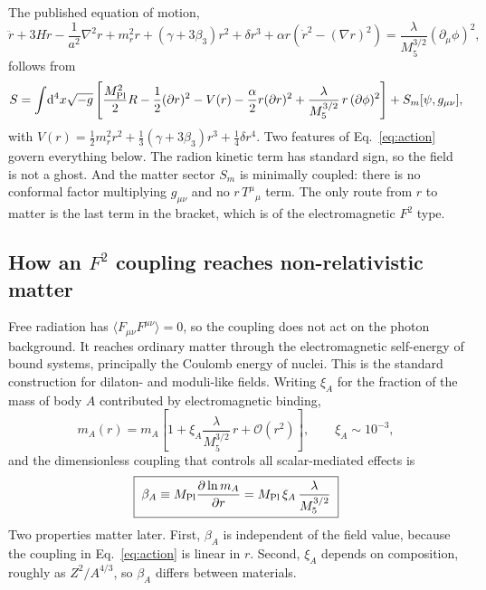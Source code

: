 \documentclass[11pt,a4paper]{article}
\newcommand{\Mpl}{M_{\rm Pl}}
\begin{document}
The published equation of motion,
\begin{equation}
\ddot r+3H\dot r-\frac{1}{a^2}\nabla^2r+m_r^2r+(\gamma+3\beta_3)r^2+\delta r^3
+\alpha r\!\left(\dot r^2-(\nabla r)^2\right)
=\frac{\lambda}{M_5^{3/2}}(\partial_\mu\phi)^2,
\label{eq:eom}
\end{equation}
follows from
\begin{equation}
S=\int\!\mathrm{d}^4x\sqrt{-g}\left[\frac{\Mpl^2}{2}R-\frac12(\partial r)^2-V(r)
-\frac{\alpha}{2}r(\partial r)^2+\frac{\lambda}{M_5^{3/2}}\,r\,(\partial\phi)^2\right]
+S_m[\psi,g_{\mu\nu}],
\label{eq:action}
\end{equation}
with $V(r)=\tfrac12 m_r^2r^2+\tfrac13(\gamma+3\beta_3)r^3+\tfrac14\delta r^4$. Two
features of Eq.~\eqref{eq:action} govern everything below. The radion kinetic term
has standard sign, so the field is not a ghost. And the matter sector $S_m$ is
minimally coupled: there is no conformal factor multiplying $g_{\mu\nu}$ and no
$r\,T^{\mu}{}_{\mu}$ term. The only route from $r$ to matter is the last term in the
bracket, which is of the electromagnetic $F^2$ type.

\subsection{How an \texorpdfstring{$F^2$}{F2} coupling reaches non-relativistic matter}
\label{sec:damour}

Free radiation has $\langle F_{\mu\nu}F^{\mu\nu}\rangle=0$, so the coupling does not
act on the photon background. It reaches ordinary matter through the electromagnetic
self-energy of bound systems, principally the Coulomb energy of nuclei. This is the
standard construction for dilaton- and moduli-like fields. Writing $\xi_A$ for the
fraction of the mass of body $A$ contributed by electromagnetic binding,
\begin{equation}
m_A(r)=m_A\left[1+\xi_A\frac{\lambda}{M_5^{3/2}}\,r+\mathcal{O}(r^2)\right],
\qquad \xi_A\sim10^{-3},
\end{equation}
and the dimensionless coupling that controls all scalar-mediated effects is
\begin{equation}
\boxed{\;\beta_A \equiv \Mpl\frac{\partial\ln m_A}{\partial r}
= \Mpl\,\xi_A\,\frac{\lambda}{M_5^{3/2}}\;}
\label{eq:beta}
\end{equation}
Two properties matter later. First, $\beta_A$ is independent of the field value,
because the coupling in Eq.~\eqref{eq:action} is linear in $r$. Second, $\xi_A$
depends on composition, roughly as $Z^2/A^{4/3}$, so $\beta_A$ differs between
materials.
\end{document}
